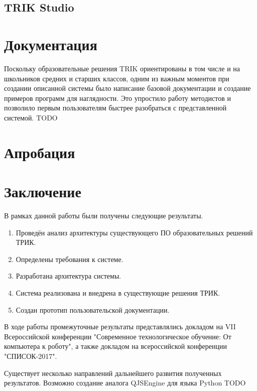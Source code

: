 \documentclass[14pt]{matmex-diploma-custom}
\begin{document}
\subsection{TRIK Studio}


\section{Документация}
Поскольку образовательные решения TRIK ориентированы в том числе и на школьников средних и старших классов, одним из важным моментов при создании описанной системы было написание базовой документации и создание примеров программ для наглядности. Это упростило работу методистов и позволило первым пользователям быстрее разобраться с представленной системой. TODO

\section{Апробация}


\section*{Заключение}

В рамках данной работы были получены следующие результаты.
\begin{enumerate}
\item Проведён анализ архитектуры существующего ПО образовательных решений ТРИК.
\item Определены требования к системе.
\item Разработана архитектура системы.
\item Система реализована и внедрена в существующие решения ТРИК.
\item Создан прототип пользовательской документации.
\end{enumerate}


В ходе работы промежуточные результаты представлялись докладом на VII Всероссийской конференции "Современное технологическое обучение: От компьютера к роботу", а также докладом на всероссийской конференции "СПИСОК-2017".

Существует несколько направлений дальнейшего развития полученных результатов. Возможно создание аналога QJSEngine для языка Python TODO

\setmonofont[Mapping=tex-text]{CMU Typewriter Text}


\end{document}
